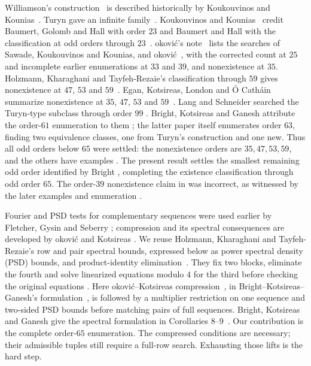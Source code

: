 \documentclass[11pt]{article}
\begin{document}
Williamson's construction~\cite{Williamson} is described historically by
Koukouvinos and Kounias~\cite[Section 1, p.~162]{KK1990}. Turyn gave an
infinite family~\cite[abstract]{Turyn}.
Koukouvinos and Kounias~\cite[Section 1, p.~162]{KK1990} credit
Baumert, Golomb and Hall with order $23$ and Baumert and Hall with the
classification at odd orders through $23$~\cite{BGH,BH}.
\DJ okovi\'c's note~\cite[Sections 1 and 5, Table 1]{Djokovic1995}
lists the searches of Sawade, Koukouvinos and Kounias, and
\DJ okovi\'c~\cite{Sawade,KK1988,KK1990,Djokovic1992,Djokovic},
with the corrected count at $25$ and incomplete earlier enumerations at
$33$ and $39$,
and nonexistence at $35$. Holzmann, Kharaghani and Tayfeh-Rezaie's classification through
$59$ gives nonexistence at $47$, $53$ and $59$~\cite[Section 4, Table 1]{HKT}.
Egan, Kotsireas, London and \'O Cath\'ain summarize nonexistence
at $35$, $47$, $53$ and $59$~\cite[Section 2.1]{EKLO}.
Lang and Schneider searched the Turyn-type subclass through order $99$
\cite{LS}. Bright, Kotsireas and Ganesh attribute the order-$61$
enumeration to them \cite[Section~2]{BKG}; the latter paper itself
enumerates order $63$, finding two equivalence classes, one from Turyn's
construction and one new. Thus all odd orders below $65$ were settled:
the nonexistence orders are $35,47,53,59$, and the others have examples
\cite[Section~2]{BKG}. The present result settles the smallest remaining
odd order identified by Bright \cite[Section~4.2]{BrightStatement},
completing the existence classification through odd order $65$.
The order-$39$ nonexistence claim in \cite{KK1990} was incorrect,
as witnessed by the later examples and enumeration \cite{Djokovic,HKT}.

Fourier and PSD tests for complementary sequences were used earlier by
Fletcher, Gysin and Seberry \cite{FGS}; compression and its spectral
consequences are developed by \DJ okovi\'c and Kotsireas \cite{DK}.
We reuse Holzmann, Kharaghani and Tayfeh-Rezaie's row and pair
spectral bounds, expressed below as power spectral density (PSD) bounds,
and product-identity elimination~\cite[Eq.~(2), Theorem 1, algorithm 2(c--d)]{HKT}.
They fix two blocks, eliminate the fourth and solve linearized equations
modulo $4$ for the third before checking the original equations
\cite[Section 3, Eqs.~(4--5), steps 2(d)(ii)(A--E)]{HKT}.
Here \DJ okovi\'c--Kotsireas compression~\cite[Definition 3, Theorem 3]{DK},
in Bright--Kotsireas--Ganesh's formulation~\cite[Definition 11, Theorem 12]{BKG},
is followed by a multiplier restriction on one sequence and two-sided
PSD bounds before matching pairs of full sequences. Bright, Kotsireas and Ganesh give the spectral formulation in
Corollaries 8--9~\cite[Corollaries 8--9]{BKG}.
Our contribution is the complete order-$65$ enumeration.
The compressed conditions are necessary; their admissible tuples still
require a full-row search. Exhausting those lifts is the hard step.
\end{document}
